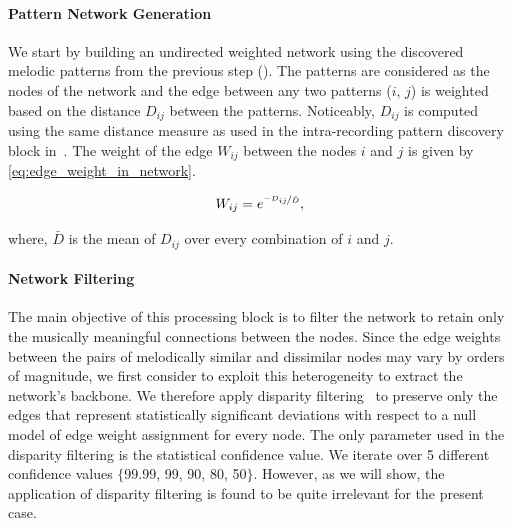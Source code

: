 \paragraph{Pattern Network Generation}
\label{sec:network_generation}

We start by building an undirected weighted network using the discovered melodic patterns from the previous step (). The patterns are considered as the nodes of the network and the edge between any two patterns ($i$, $j$) is weighted based on the distance $D_{ij}$ between the patterns. Noticeably, $D_{ij}$ is computed using the same distance measure as used in the intra-recording pattern discovery block in~. The weight of the edge $W_{ij}$ between the nodes $i$ and $j$ is given by \eqref{eq:edge_weight_in_network}. 

\begin{equation}
W_{ij} = e^{\nicefrac{-D_{ij}}{\bar{D}}},
\label{eq:edge_weight_in_network}
\end{equation}

\noindent where, $\bar{D}$ is the mean of $D_{ij}$ over every combination of $i$ and $j$. 


\paragraph{Network Filtering}
\label{sec:network_filtering}

The main objective of this processing block is to filter the network to retain only the musically meaningful connections between the nodes. Since the edge weights between the pairs of melodically similar and dissimilar nodes may vary by orders of magnitude, we first consider to exploit this heterogeneity to extract the network's backbone. We therefore apply disparity filtering~\citep{Serrano09PNAS} to preserve only the edges that represent statistically significant deviations with respect to a null model of edge weight assignment for every node. The only parameter used in the disparity filtering is the statistical confidence value. We iterate over 5 different confidence values $\lbrace$99.99, 99, 90, 80, 50$\rbrace$. However, as we will show, the application of disparity filtering is found to be quite irrelevant for the present case.

